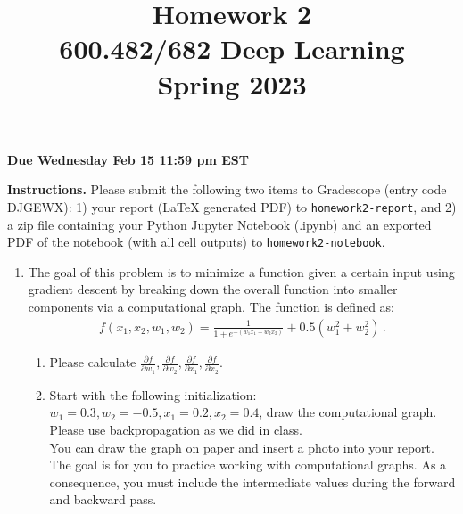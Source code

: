 \documentclass[a4paper]{article}
\title{Homework 2\\
600.482/682 Deep Learning\\
Spring 2023}
\begin{document}
\maketitle


\centerline{\textbf{Due Wednesday Feb 15 11:59 pm EST}}
\noindent \textbf{Instructions.} Please submit the following two items to Gradescope (entry code DJGEWX): 1) your report (LaTeX generated PDF) to \texttt{homework2-report}, and 2) a zip file containing your Python Jupyter Notebook (.ipynb) and an exported PDF of the notebook (with all cell outputs) to \texttt{homework2-notebook}.

\vspace{5mm}

\begin{enumerate}
\item The goal of this problem is to minimize a function given a certain input using gradient descent by breaking down the overall function into smaller components via a computational graph. The function is defined as:
	\begin{align*}
		f(x_1, x_2, w_1, w_2) = \frac{1}{1+e^{-(w_1 x_1+w_2 x_2)}} + 0.5(w_1^2 + w_2^2)\,.
	\end{align*}
	\begin{enumerate}
		\item Please calculate $\frac{\partial f}{\partial w_1}, \frac{\partial f}{\partial w_2}, \frac{\partial f}{\partial x_1}, \frac{\partial f}{\partial x_2}$.
		\item Start with the following initialization: $w_1 = 0.3, w_2 = -0.5, x_1 = 0.2, x_2 = 0.4$, draw the computational graph. Please use backpropagation as we did in class.\\
		You can draw the graph on paper and insert a photo into your report.\\
		The goal is for you to practice working with computational graphs. As a consequence, you must include the intermediate values during the forward and backward pass.
	\end{enumerate}


\end{enumerate}
\end{document}
